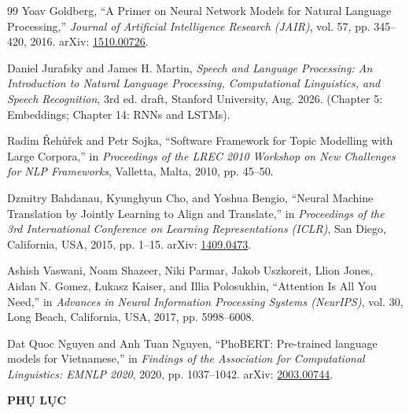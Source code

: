 \documentclass[12pt,a4paper]{article}
\begin{document}
\begin{thebibliography}{99}
 Yoav Goldberg, “A Primer on Neural Network Models for Natural Language Processing,” \textit{Journal of Artificial Intelligence Research (JAIR)}, vol. 57, pp. 345--420, 2016. arXiv: \href{https://arxiv.org/abs/1510.00726}{1510.00726}.

 Daniel Jurafsky and James H. Martin, \textit{Speech and Language Processing: An Introduction to Natural Language Processing, Computational Linguistics, and Speech Recognition}, 3rd ed. draft, Stanford University, Aug. 2026. (Chapter 5: Embeddings; Chapter 14: RNNs and LSTMs).

 Radim Řehůřek and Petr Sojka, “Software Framework for Topic Modelling with Large Corpora,” in \textit{Proceedings of the LREC 2010 Workshop on New Challenges for NLP Frameworks}, Valletta, Malta, 2010, pp. 45--50.

 Dzmitry Bahdanau, Kyunghyun Cho, and Yoshua Bengio, “Neural Machine Translation by Jointly Learning to Align and Translate,” in \textit{Proceedings of the 3rd International Conference on Learning Representations (ICLR)}, San Diego, California, USA, 2015, pp. 1--15. arXiv: \href{https://arxiv.org/abs/1409.0473}{1409.0473}.

 Ashish Vaswani, Noam Shazeer, Niki Parmar, Jakob Uszkoreit, Llion Jones, Aidan N. Gomez, Łukasz Kaiser, and Illia Polosukhin, “Attention Is All You Need,” in \textit{Advances in Neural Information Processing Systems (NeurIPS)}, vol. 30, Long Beach, California, USA, 2017, pp. 5998--6008.

 Dat Quoc Nguyen and Anh Tuan Nguyen, “PhoBERT: Pre-trained language models for Vietnamese,” in \textit{Findings of the Association for Computational Linguistics: EMNLP 2020}, 2020, pp. 1037--1042. arXiv: \href{https://arxiv.org/abs/2003.00744}{2003.00744}.

\end{thebibliography}
\endgroup

\newpage
{}\label{sec:appendix}
\begin{center}
    {\large\bfseries PHỤ LỤC}
\end{center}
\vspace{0.5cm}
\end{document}
